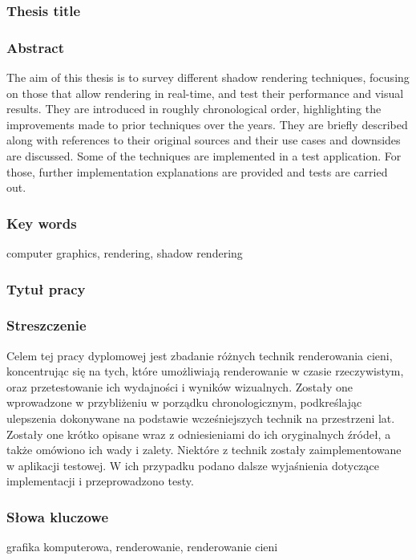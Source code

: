 \subsubsection*{Thesis title}
\Title

\subsubsection*{Abstract}
The aim of this thesis is to survey different shadow rendering techniques, focusing on those that allow rendering in real-time, and test their performance and visual results. They are introduced in roughly chronological order, highlighting the improvements made to prior techniques over the years. They are briefly described along with references to their original sources and their use cases and downsides are discussed. Some of the techniques are implemented in a test application. For those, further implementation explanations are provided and tests are carried out.

\subsubsection*{Key words}
computer graphics, rendering, shadow rendering

\subsubsection*{Tytuł pracy}
\begin{otherlanguage}{polish}
\TitleAlt
\end{otherlanguage}

\subsubsection*{Streszczenie}
\begin{otherlanguage}{polish}
Celem tej pracy dyplomowej jest zbadanie różnych technik renderowania cieni, koncentrując się na tych, które umożliwiają renderowanie w czasie rzeczywistym, oraz przetestowanie ich wydajności i wyników wizualnych. Zostały one wprowadzone w przybliżeniu w porządku chronologicznym, podkreślając ulepszenia dokonywane na podstawie wcześniejszych technik na przestrzeni lat. Zostały one krótko opisane wraz z odniesieniami do ich oryginalnych źródeł, a także omówiono ich wady i zalety. Niektóre z technik zostały zaimplementowane w aplikacji testowej. W ich przypadku podano dalsze wyjaśnienia dotyczące implementacji i przeprowadzono testy.
\end{otherlanguage}

\subsubsection*{Słowa kluczowe}
\begin{otherlanguage}{polish}
grafika komputerowa, renderowanie, renderowanie cieni
\end{otherlanguage}
